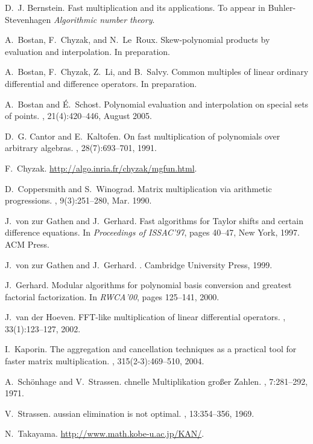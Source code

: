 \documentclass{sig-alt-full}
\def\gathen#1{{#1}}
\def\hoeven#1{{#1}}
\begin{document}
\scriptsize
\begin{thebibliography}{10}

D.~J. Bernstein.
\newblock Fast multiplication and its applications.
\newblock To appear in Buhler-Stevenhagen {\it Algorithmic number theory}.

A.~Bostan, F.~Chyzak, and N.~Le~Roux.
\newblock Skew-polynomial products by evaluation and interpolation.
\newblock In preparation.

A.~Bostan, F.~Chyzak, Z.~Li, and B.~Salvy.
\newblock Common multiples of linear ordinary differential and difference
  operators.
\newblock In preparation.

A.~Bostan and {\'E}.~Schost.
\newblock Polynomial evaluation and interpolation on special sets of points.
, 21(4):420--446, August 2005.

D.~G. Cantor and E.~Kaltofen.
\newblock On fast multiplication of polynomials over arbitrary algebras.
, 28(7):693--701, 1991.

F.~Chyzak.
\newblock \url{http://algo.inria.fr/chyzak/mgfun.html}.

D.~Coppersmith and S.~Winograd.
\newblock Matrix multiplication via arithmetic progressions.
, 9(3):251--280, Mar. 1990.

J.~\gathen{von zur} Gathen and J.~Gerhard.
\newblock Fast algorithms for {T}aylor shifts and certain difference equations.
\newblock In {\em Proceedings of ISSAC'97}, pages 40--47, New York, 1997. ACM
  Press.

J.~\gathen{von zur} Gathen and J.~Gerhard.
.
\newblock Cambridge University Press, 1999.

J.~Gerhard.
\newblock Modular algorithms for polynomial basis conversion and greatest
  factorial factorization.
\newblock In {\em RWCA'00}, pages 125--141, 2000.

J.~\hoeven{van der} Hoeven.
\newblock F{FT}-like multiplication of linear differential operators.
, 33(1):123--127, 2002.

I.~Kaporin.
\newblock The aggregation and cancellation techniques as a practical tool for
  faster matrix multiplication.
, 315(2-3):469--510, 2004.

A.~Sch\"onhage and V.~Strassen.
chnelle {M}ultiplikation gro\ss er {Z}ahlen.
, 7:281--292, 1971.

V.~Strassen.
aussian elimination is not optimal.
, 13:354--356, 1969.

N.~Takayama.
\newblock \url{http://www.math.kobe-u.ac.jp/KAN/}.

\end{thebibliography}
\end{document}
